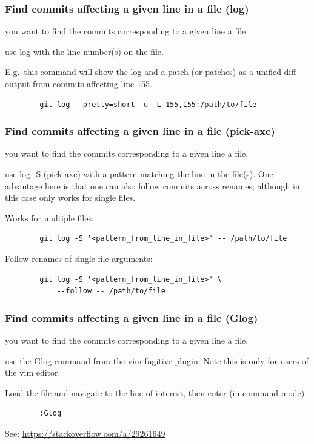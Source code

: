 \documentclass{git_course}
\begin{document}
\begin{frame}[fragile]
    \frametitle{Find commits affecting a given line in a file (log)}

     you want to find the commits corresponding to a given
    line a file.

     use log with the line number(s) on the file.

    E.g.\ this command will show the log and a patch (or patches) as a unified diff
    output from commits affecting line 155.
    \begin{verbatim}
        git log --pretty=short -u -L 155,155:/path/to/file
    \end{verbatim}

\end{frame}

\begin{frame}[fragile]
    \frametitle{Find commits affecting a given line in a file (pick-axe)}

     you want to find the commits corresponding to a given
    line a file.

     use log -S (pick-axe) with a pattern matching the line
    in the file(s).  One advantage here is that one can also follow commits
    across renames; although in this case only works for single files.

Works for multiple files:
    \begin{verbatim}
        git log -S '<pattern_from_line_in_file>' -- /path/to/file
    \end{verbatim}

Follow renames of single file arguments:
    \begin{verbatim}
        git log -S '<pattern_from_line_in_file>' \
            --follow -- /path/to/file
    \end{verbatim}

\end{frame}


\begin{frame}[fragile]
    \frametitle{Find commits affecting a given line in a file (Glog)}

     you want to find the commits corresponding to a given
    line a file.

     use the Glog command from the vim-fugitive plugin.  Note
    this is only for users of the vim editor.

    Load the file and navigate to the line of interest, then enter (in
    command mode)
    \begin{verbatim}
        :Glog
    \end{verbatim}

    See: \url{https://stackoverflow.com/a/29261649}
\end{frame}
\end{document}
